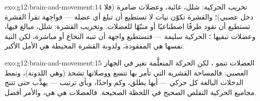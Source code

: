\begin{solution}{exo:g12:brain-and-movement:14}
تخريب  الحركية: شلل،  غائبة، وعضلات ضامرة (فلا دخل
عصبي)؛ والقشرة تكوّن نيات لا تستطيع أن تبلغ أي عضلة --- فواجهة تقرأ
القشرة تستطيع أن تقود طرفًا اصطناعيًا أو منبّهًا للعضلات. وتخريب القشرة:
شلل،  مبالغ فيها، وعضلات تبقيها ؛  الحركية
سليمة --- فتستطيع واجهة أن تنبه النخاع أو  مباشرة، لكن النية
نفسها هي المفقودة، ولدونة القشرة المحيطة هي الأمل الأكبر.
\end{solution}

\begin{solution}{exo:g12:brain-and-movement:15}
العضلات تنمو ، لكن الحركة المتعلَّمة تغير في الجهاز العصبي:
فالمساحة القشرية التي تأمر بها تتسع ووصلاتها تشحذ (وهي اللدونة)، ونمط
الدخلات البالغة كل  حركي --- أيها يطلق، وكم واحدًا، وبأي ترتيب ---
يهذَّب حتى تنتج مجاميع  الحركية التقلص الصحيح في اللحظة
الصحيحة. فالعضلات هي هي، والأمر أفضل.
\end{solution}


